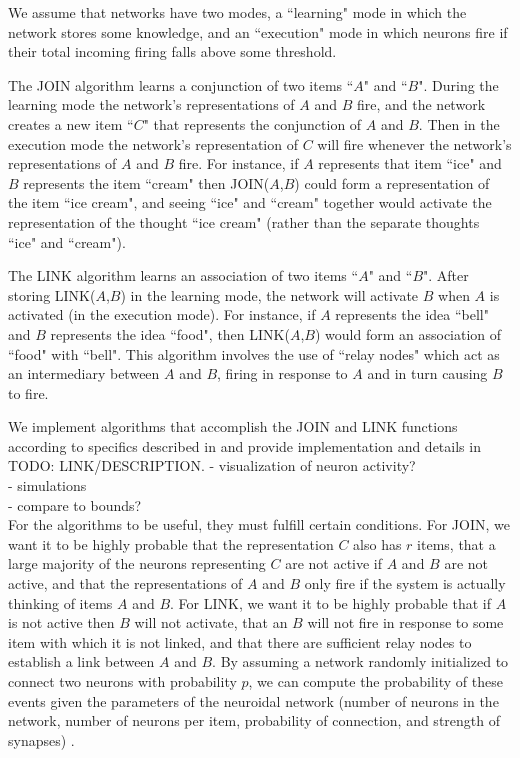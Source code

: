 \documentclass[letterpaper, 12pt]{article}
\begin{document}
We assume that networks have two modes, a ``learning" mode in which the network stores some knowledge, and an ``execution" mode in which neurons fire if their total incoming firing falls above some threshold. 

The JOIN algorithm learns a conjunction of two items ``$A$" and ``$B$". During the learning mode the network's representations of $A$ and $B$ fire, and the network creates a new item ``$C$" that represents the conjunction of $A$ and $B$. Then in the execution mode the network's representation of $C$ will fire whenever the network's representations of $A$ and $B$ fire. For instance, if $A$ represents that item ``ice" and $B$ represents the item ``cream" then JOIN($A$,$B$) could form a representation of the item ``ice cream", and seeing ``ice" and ``cream" together would activate the representation of the thought ``ice cream" (rather than the separate thoughts ``ice" and ``cream").

The LINK algorithm learns an association of two items ``$A$" and ``$B$". After storing LINK($A$,$B$) in the learning mode, the network will activate $B$ when $A$ is activated (in the execution mode). For instance, if $A$ represents the idea ``bell" and $B$ represents the idea ``food", then LINK($A$,$B$) would form an association of ``food" with ``bell". This algorithm involves the use of ``relay nodes" which act as an intermediary between $A$ and $B$, firing in response to $A$ and in turn causing $B$ to fire.

We implement algorithms that accomplish the JOIN and LINK functions according to specifics described in \cite{valiant_memorization_2005} and provide implementation and details in TODO: LINK/DESCRIPTION.
- visualization of neuron activity?\\
- simulations\\
- compare to bounds?\\

For the algorithms to be useful, they must fulfill certain conditions. For JOIN, we want it to be highly probable that the representation $C$ also has $r$ items, that a large majority of the neurons representing $C$ are not active if $A$ and $B$ are not active, and that the representations of $A$ and $B$ only fire if the system is actually thinking of items $A$ and $B$. For LINK, we want it to be highly probable that if $A$ is not active then $B$ will not activate, that an $B$ will not fire in response to some item with which it is not linked, and that there are sufficient relay nodes to establish a link between $A$ and $B$. By assuming a network randomly initialized to connect two neurons with probability $p$, we can compute the probability of these events given the parameters of the neuroidal network (number of neurons in the network, number of neurons per item, probability of connection, and strength of synapses) \cite{valiant_memorization_2005}.
\end{document}
